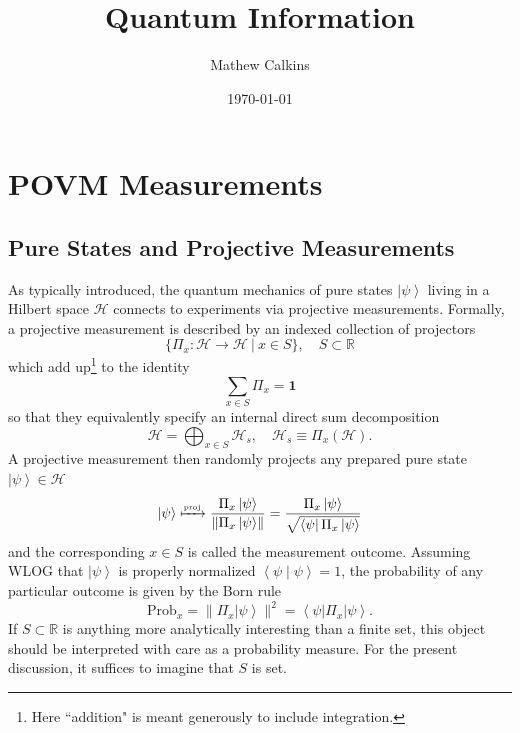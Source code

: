 \documentclass[11pt,letterpaper]{article}
\newcommand{\mc}[1]{\mathcal{#1}}
\newcommand{\R}{\mathbb{R}}
\newcommand{\KET}[1]{\left| #1 \right\rangle }
\newcommand{\BRA}[1]{\left\langle #1 \right| }
\newcommand{\IP}[2]{\left\langle #1 \middle| #2 \right\rangle}
\begin{document}
\title{Quantum Information}

\author{Mathew Calkins}

\date{\today}

 
\maketitle


\tableofcontents




\section{POVM Measurements}

\subsection{Pure States and Projective Measurements}
As typically introduced, the quantum mechanics of pure states $\KET{\psi}$ living in a Hilbert space $\mc{H}$ connects to experiments via projective measurements. Formally, a projective measurement is described by an indexed collection of projectors \begin{equation}
\{ \Pi_x: \mc{H} \to \mc{H} \ | \ x \in S \}, \quad S \subset \R
\end{equation}
which add up\footnote{Here ``addition" is meant generously to include integration.} to the identity \begin{equation}
\sum_{x \in S} \Pi_x = \mathbf{1}
\end{equation}
so that they equivalently specify an internal direct sum decomposition \begin{equation}
\mc{H} = \bigoplus_{x \in S} \mc{H}_s, \quad \mc{H}_s \equiv \Pi_x (\mc{H}).
\end{equation}
A projective measurement then randomly projects any prepared pure state $\KET{\psi} \in \mc{H}$ \begin{equation}
\KET{\psi} \xmapsto{\mbox{\tiny{proj}}} \frac{\Pi_x \KET{\psi}}{\lVert \Pi_x \KET{\psi} \rVert} = \frac{\Pi_x \KET{\psi}}{\sqrt{\BRA{\psi} \Pi_x \KET{\psi}}}
\end{equation}
and the corresponding $x \in S$ is called the measurement outcome. Assuming WLOG that $\KET{\psi}$ is properly normalized $\IP{\psi}{\psi} = 1$, the probability of any particular outcome is given by the Born rule \begin{equation}
\mbox{Prob}_x = \lVert \Pi_x \KET{\psi} \rVert ^2 = \BRA{\psi} \Pi_x \KET{\psi}.
\end{equation}
If $S \subset \R$ is anything more analytically interesting than a finite set, this object should be interpreted with care as a probability measure. For the present discussion, it suffices to imagine that $S$ is set.
\end{document}
